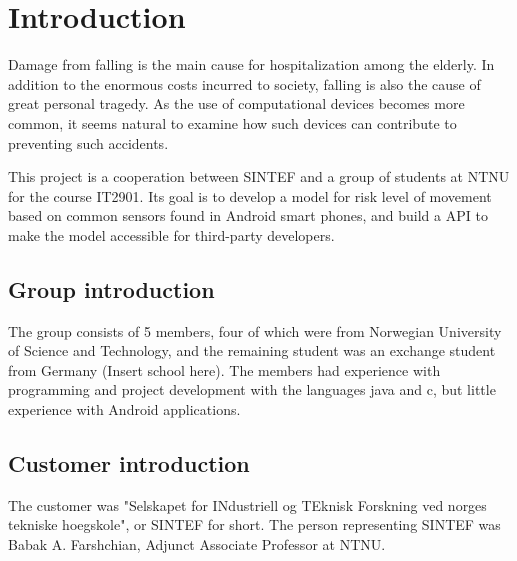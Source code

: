 \chapter{Introduction}

Damage from falling is the main cause for hospitalization among the elderly. In addition to the enormous costs incurred to society, falling is also the cause of great personal tragedy. As the use of computational devices becomes more common, it seems natural to examine how such devices can contribute to preventing such accidents.

This project is a cooperation between SINTEF and a group of students at NTNU for the course IT2901. Its goal is to develop a model for risk level of movement based on common sensors found in Android smart phones, and build a API to make the model accessible for third-party developers.

\section{Group introduction}
The group consists of 5 members, four of which were from Norwegian University of Science and Technology, and the remaining student was an exchange student from Germany (Insert school here). The members had experience with programming and project development with the languages java and c$  $, but little experience with Android applications. 

\section{Customer introduction}
The customer was "Selskapet for INdustriell og TEknisk Forskning ved norges tekniske hoegskole", or SINTEF for short. The person representing SINTEF was Babak A. Farshchian, Adjunct Associate Professor at NTNU. 
